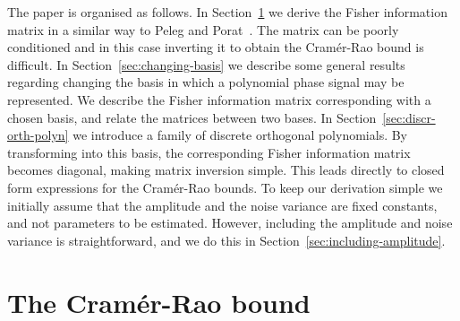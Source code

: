 \documentclass[5p]{elsarticle}
\begin{document}

The paper is organised as follows.  In Section~\ref{sec_crb} we derive the Fisher information matrix in a similar way to Peleg and Porat~\cite{Peleg1991_CRB_PPS_1991}.  The matrix can be poorly conditioned and in this case inverting it to obtain the Cram\'{e}r-Rao bound is difficult.  In Section~\ref{sec:changing-basis} we describe some general results regarding changing the basis in which a polynomial phase signal may be represented.  We describe the Fisher information matrix corresponding with a chosen basis, and relate the matrices between two bases.  In Section~\ref{sec:discr-orth-polyn} we introduce a family of discrete orthogonal polynomials.  By transforming into this basis, the corresponding Fisher information matrix becomes diagonal, making matrix inversion simple.  This leads directly to closed form expressions for the Cram\'{e}r-Rao bounds.  %
To keep our derivation simple we initially assume that the amplitude and the noise variance are fixed constants, and not parameters to be estimated.  However, including the amplitude and noise variance is straightforward, and we do this in Section~\ref{sec:including-amplitude}.  


\section{The Cram\'{e}r-Rao bound} \label{sec_crb}
\end{document}
